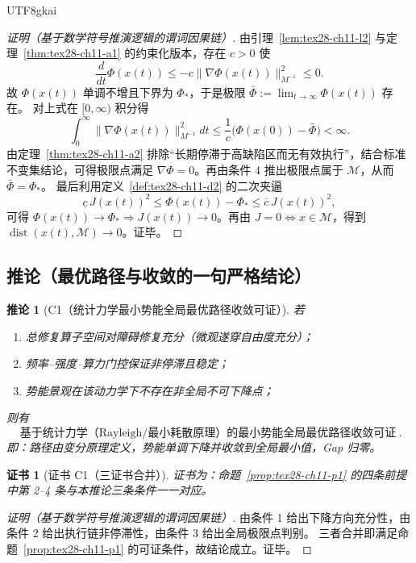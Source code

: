 \documentclass[12pt]{article}
\newtheorem{corollary}{推论}[section]
\newtheorem{Certificate}{证书}[section]
\begin{document}
\begin{CJK*}{UTF8}{gkai}
\begin{proof}[证明（基于数学符号推演逻辑的谓词因果链）]
由引理~\ref{lem:tex28-ch11-l2} 与定理~\ref{thm:tex28-ch11-a1} 的约束化版本，存在 $c>0$ 使
\[
  \frac{d}{dt}\Phi(x(t))\le -c\|\nabla\Phi(x(t))\|_{M^{-1}}^2\le 0.
\]
故 $\Phi(x(t))$ 单调不增且下界为 $\Phi_*$，于是极限 $\bar\Phi:=\lim_{t\to\infty}\Phi(x(t))$ 存在。
对上式在 $[0,\infty)$ 积分得
\[
  \int_0^\infty \|\nabla\Phi(x(t))\|_{M^{-1}}^2dt
  \le
  \frac{1}{c}\bigl(\Phi(x(0))-\bar\Phi\bigr)
  <\infty.
\]
由定理~\ref{thm:tex28-ch11-a2} 排除“长期停滞于高缺陷区而无有效执行”，结合标准不变集结论，可得极限点满足
$\nabla\Phi=0$。再由条件 4 推出极限点属于 $\mathcal{M}$，从而 $\bar\Phi=\Phi_*$。
最后利用定义~\ref{def:tex28-ch11-d2} 的二次夹逼
\[
  \underline c\,J(x(t))^2\le \Phi(x(t))-\Phi_*\le \overline c\,J(x(t))^2,
\]
可得 $\Phi(x(t))\to\Phi_*\Rightarrow J(x(t))\to0$。再由 $J=0\Leftrightarrow x\in\mathcal{M}$，得到
$\operatorname{dist}(x(t),\mathcal{M})\to0$。证毕。
\end{proof}

\subsection{推论（最优路径与收敛的一句严格结论）}
\label{subsec:tex28-ch11-corollaries}

\begin{corollary}[C1（统计力学最小势能全局最优路径收敛可证）]
\label{cor:tex28-ch11-c1}
若
\begin{enumerate}
  \item 总修复算子空间对障碍修复充分（微观遂穿自由度充分）；
  \item 频率--强度--算力门控保证非停滞且稳定；
  \item 势能景观在该动力学下不存在非全局不可下降点；
\end{enumerate}
则有
\[
  \boxed{\ \text{基于统计力学（Rayleigh/最小耗散原理）的最小势能全局最优路径收敛可证}\ }.
\]
即：路径由变分原理定义，势能单调下降并收敛到全局最小值，Gap 归零。
\end{corollary}

\begin{Certificate}[证书 C1（三证书合并）]
\label{cert:tex28-ch11-c1}
证书为：命题~\ref{prop:tex28-ch11-p1} 的四条前提中第 2--4 条与本推论三条条件一一对应。
\end{Certificate}

\begin{proof}[证明（基于数学符号推演逻辑的谓词因果链）]
由条件 1 给出下降方向充分性，由条件 2 给出执行链非停滞性，由条件 3 给出全局极限点判别。
三者合并即满足命题~\ref{prop:tex28-ch11-p1} 的可证条件，故结论成立。证毕。
\end{proof}


\end{CJK*}
\end{document}
